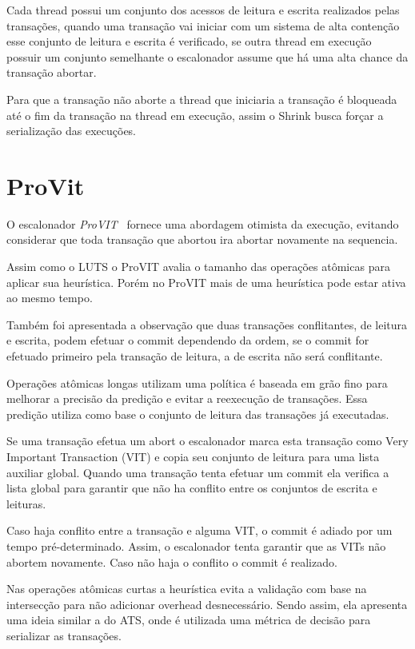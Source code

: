 \documentclass[diss,capa]{texufpel}
\begin{document}
Cada thread possui um conjunto dos acessos de leitura e escrita realizados pelas transações, quando uma transação vai iniciar com um sistema de alta contenção esse conjunto de leitura e escrita é verificado, se outra thread em execução possuir um conjunto semelhante o escalonador assume que há uma alta chance da transação abortar.

Para que a transação não aborte a thread que iniciaria a transação é bloqueada até o fim da transação na thread em execução, assim o Shrink busca forçar a serialização das execuções.

\section{ProVit}

O escalonador \emph{ProVIT}~\cite{rito2015} fornece uma abordagem otimista da execução, evitando considerar que toda transação que abortou ira abortar novamente na sequencia. 

Assim como o LUTS o ProVIT avalia o tamanho das operações atômicas para aplicar sua heurística. Porém no ProVIT mais de uma heurística pode estar ativa ao mesmo tempo. 

Também foi apresentada a observação que duas transações conflitantes, de leitura e escrita, podem efetuar o commit dependendo da ordem, se o commit for efetuado primeiro pela transação de leitura, a de escrita não será conflitante.

Operações atômicas longas utilizam uma política é baseada em grão fino para melhorar a precisão da predição e evitar a reexecução de transações. Essa predição utiliza como base o conjunto de leitura das transações já executadas.

Se uma transação efetua um abort o escalonador marca esta transação como Very Important Transaction (VIT) e copia seu conjunto de leitura para uma lista auxiliar global.  Quando uma transação tenta efetuar um commit ela verifica a lista global para garantir que não ha conflito entre os conjuntos de escrita e leituras.

Caso haja conflito entre a transação e alguma VIT, o commit é adiado por um tempo pré-determinado. Assim, o escalonador tenta garantir que as VITs não abortem novamente. Caso não haja o conflito o commit é realizado.

Nas operações atômicas curtas a heurística evita a validação com base na intersecção para não adicionar overhead desnecessário. Sendo assim, ela apresenta uma ideia similar a do ATS, onde é utilizada uma métrica de decisão para serializar as transações.
\end{document}
